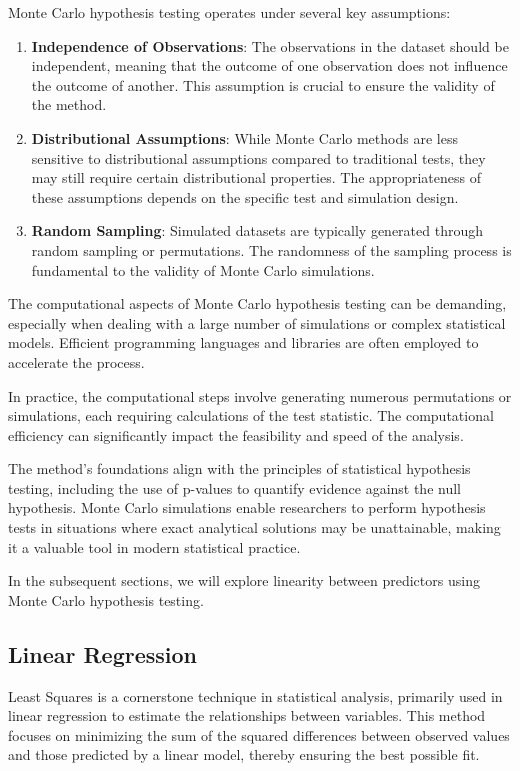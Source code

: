 \documentclass[12pt]{article}
\numberwithin{figure}{section}
\begin{document}
Monte Carlo hypothesis testing operates under several key assumptions:

\begin{enumerate}
    \item \textbf{Independence of Observations}: The observations in the dataset should be independent, meaning that the outcome of one observation does not influence the outcome of another. This assumption is crucial to ensure the validity of the method.
    
    \item \textbf{Distributional Assumptions}: While Monte Carlo methods are less sensitive to distributional assumptions compared to traditional tests, they may still require certain distributional properties. The appropriateness of these assumptions depends on the specific test and simulation design.
    
    \item \textbf{Random Sampling}: Simulated datasets are typically generated through random sampling or permutations. The randomness of the sampling process is fundamental to the validity of Monte Carlo simulations.
\end{enumerate}

The computational aspects of Monte Carlo hypothesis testing can be demanding, especially when dealing with a large number of simulations or complex statistical models. Efficient programming languages and libraries are often employed to accelerate the process.

In practice, the computational steps involve generating numerous permutations or simulations, each requiring calculations of the test statistic. The computational efficiency can significantly impact the feasibility and speed of the analysis.

The method's foundations align with the principles of statistical hypothesis testing, including the use of p-values to quantify evidence against the null hypothesis. Monte Carlo simulations enable researchers to perform hypothesis tests in situations where exact analytical solutions may be unattainable, making it a valuable tool in modern statistical practice.

In the subsequent sections, we will explore linearity between predictors using Monte Carlo hypothesis testing.


\subsection{Linear Regression}
Least Squares is a cornerstone technique in statistical analysis, primarily used in linear regression to estimate the relationships between variables. This method focuses on minimizing the sum of the squared differences between observed values and those predicted by a linear model, thereby ensuring the best possible fit.
\end{document}
